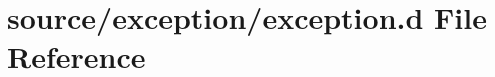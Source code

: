 \hypertarget{exception_8d}{
\section{source/exception/exception.d File Reference}
\label{exception_8d}
}
